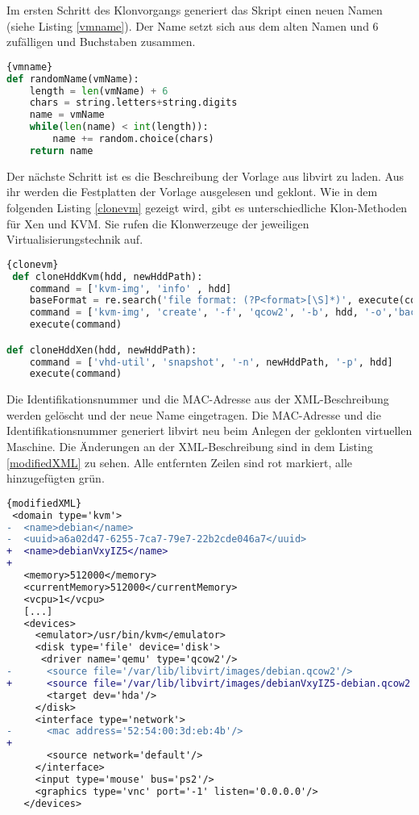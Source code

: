 Im ersten Schritt des Klonvorgangs generiert das Skript einen neuen Namen (siehe Listing \ref{vmname}). Der Name setzt sich aus dem alten Namen und 6 zufälligen und Buchstaben zusammen.
\\
\begin{lstlisting}[caption=Erstellen des Namens der VM,language=Python, label=vmname]{vmname}
def randomName(vmName):
	length = len(vmName) + 6
	chars = string.letters+string.digits
	name = vmName
	while(len(name) < int(length)):
		name += random.choice(chars)
	return name
\end{lstlisting}

Der nächste Schritt ist es die Beschreibung der Vorlage aus libvirt zu laden. Aus ihr werden die Festplatten der Vorlage ausgelesen und geklont. Wie in dem folgenden Listing \ref{clonevm} gezeigt wird, gibt es unterschiedliche Klon-Methoden für Xen und KVM. Sie rufen die Klonwerzeuge der jeweiligen Virtualisierungstechnik auf.
\\
\begin{lstlisting}[caption=VM-Auswahl,language=Python, label=clonevm]{clonevm}
 def cloneHddKvm(hdd, newHddPath):
	command = ['kvm-img', 'info' , hdd]
	baseFormat = re.search('file format: (?P<format>[\S]*)', execute(command)).groupdict()['format']
	command = ['kvm-img', 'create', '-f', 'qcow2', '-b', hdd, '-o','backing_fmt=' + baseFormat, newHddPath]
	execute(command)

def cloneHddXen(hdd, newHddPath):
	command = ['vhd-util', 'snapshot', '-n', newHddPath, '-p', hdd]
	execute(command)
\end{lstlisting}

Die Identifikationsnummer und die MAC-Adresse aus der XML-Beschreibung werden gelöscht und der neue Name eingetragen. Die MAC-Adresse und die Identifikationsnummer generiert libvirt neu beim Anlegen der geklonten virtuellen Maschine. Die Änderungen an der XML-Beschreibung sind in dem Listing \ref{modifiedXML} zu sehen. Alle entfernten Zeilen sind rot markiert, alle hinzugefügten grün.
\\
\begin{lstlisting}[caption=modifizierte XML-Beschreibung,language=diff,label=modifiedXML]{modifiedXML}
 <domain type='kvm'>
-  <name>debian</name>
-  <uuid>a6a02d47-6255-7ca7-79e7-22b2cde046a7</uuid>
+  <name>debianVxyIZ5</name>
+  
   <memory>512000</memory>
   <currentMemory>512000</currentMemory>
   <vcpu>1</vcpu>
   [...]
   <devices>
     <emulator>/usr/bin/kvm</emulator>
     <disk type='file' device='disk'>
      <driver name='qemu' type='qcow2'/>
-      <source file='/var/lib/libvirt/images/debian.qcow2'/>
+      <source file='/var/lib/libvirt/images/debianVxyIZ5-debian.qcow2'/>
       <target dev='hda'/>
     </disk>
     <interface type='network'>
-      <mac address='52:54:00:3d:eb:4b'/>
+      
       <source network='default'/>
     </interface>
     <input type='mouse' bus='ps2'/>
     <graphics type='vnc' port='-1' listen='0.0.0.0'/>
   </devices>
\end{lstlisting}

